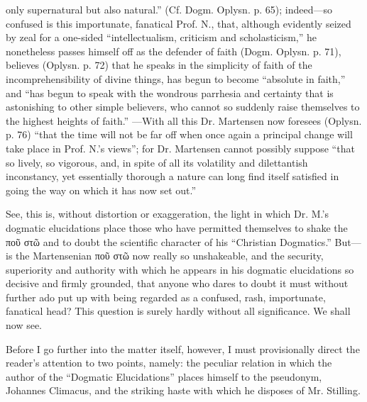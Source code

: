 \documentclass[12pt,a4paper,openany]{book}
\newcommand{\opage}[1]{\marginnote{\footnotesize\textit{[#1]}}}
\begin{document}
only supernatural but also natural.'' (Cf.
Dogm. Oplysn. p. 65); indeed---so confused is this importunate,
fanatical Prof. N., that, although evidently
seized by zeal for a one-sided ``intellectualism, criticism
and scholasticism,'' he nonetheless passes himself off
as the defender of faith (Dogm. Oplysn. p. 71), believes (Oplysn.
p. 72) that he speaks in the simplicity of faith of the incomprehensibility of divine
things, has begun to become ``absolute in faith,''
and ``has begun to speak with the wondrous parrhesia and
certainty that is astonishing to other simple believers, who
cannot so suddenly raise themselves to the highest heights of faith.''
---With all this Dr. Martensen now foresees (Oplysn.
p. 76) ``that the time will not be far off when once again
a principal change will take place in Prof. N.'s views''; for
Dr. Martensen cannot possibly suppose ``that so lively, so
vigorous, and, in spite of all its volatility and dilettantish
inconstancy, yet essentially thorough a nature can long find
itself satisfied in going the way on which it has now set out.''

See, this is, without distortion or exaggeration, the light
in which Dr. M.'s dogmatic elucidations place those
who have permitted themselves to shake the ποῦ στῶ and to doubt
\setcounter{footnote}{0}%
\opage{9}the scientific character of his ``Christian Dogmatics.'' But---
is the Martensenian ποῦ στῶ now really so unshakeable,
and the security, superiority and authority with which
he appears in his dogmatic elucidations so decisive
and firmly grounded, that anyone who dares to doubt
it must without further ado put up with being regarded as a
confused, rash, importunate, fanatical head? This
question is surely hardly without all significance. We shall
now see.

Before I go further into the matter itself, however,
I must provisionally direct the reader's attention to two
points, namely: the peculiar relation in which the author
of the ``Dogmatic Elucidations'' places himself to the pseudonym,
Johannes Climacus, and the striking haste
with which he disposes of Mr. Stilling.
\end{document}

